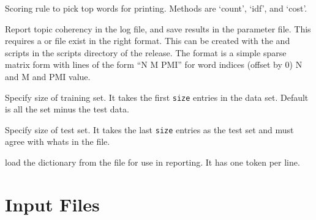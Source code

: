 \documentclass[a4paper,english]{article}
\begin{document}
\begin{Description}
\begin{Description}[class]
\end{Description}
\item[\OptArg{-o}{score}]  Scoring rule to pick top words for printing.
Methods are `count', `idf', and `cost'.
\item[\OptArg{-p}] Report topic coherency in the log file, and 
save results in the parameter file.  This requires 
a  or  file exist
in the right format.  This can be created with the 
 and
 scripts in the scripts directory of the release.
The format is a simple sparse matrix form with lines
of the form ``N M PMI'' for word indices
(offset by 0) N and M and PMI value.
\item[\OptArg{-t}{size}]  Specify size of training set.  It takes the
first \texttt{size} entries in the data set. Default is all the
set minus the test data.
\item[\OptArg{-T}{size}]  Specify size of test set.  It takes the last
\texttt{size} entries as the test set and must agree
with whats in the  file.
\item[\Opt{-V}]  load the dictionary from the
 file for use in reporting.  It has one token per line.
\end{Description}

\section{Input Files}
\end{document}
